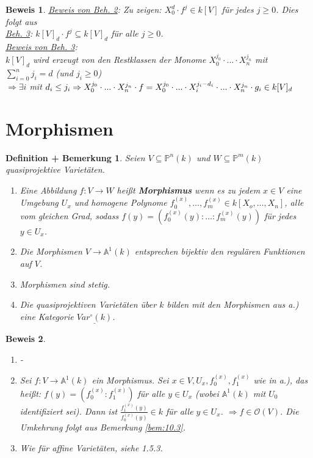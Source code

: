\documentclass[a4paper,12pt]{report}
\theoremstyle{break}
\newtheorem{DefBem}[Def]{Definition + Bemerkung}
\theoremstyle{nonumberbreak}
\theoremstyle{nonumberplain}
\newtheorem{Bew}{Beweis}
\newcommand{\emp}[1]{\textbf{\emph{#1}}}
\newcommand{\begriff}[1]{{\index{#1}}\emp{#1}}
\begin{document}
\begin{Bew}
\underline{Beweis von Beh. 2}: Zu zeigen: $X_0^d\cdot f^j\in k[V]$ für jedes $j\geq 0$. Dies folgt aus \\
\underline{Beh. 3}: $k[V]_d\cdot f^j\subseteq k[V]_d$ für alle $j\geq 0$.\\
\underline{Beweis von Beh. 3}:\\
$k[V]_d$ wird erzeugt von den Restklassen der Monome $X_0^{j_0}\cdot ... \cdot X_n^{j_n}$ mit $\sum_{i=0}^nj_i=d$ (und $j_i\geq 0$)\\
$\Rightarrow\exists i$ mit $d_i\leq j_i\\
\Rightarrow X_0^{j_0}\cdot ... \cdot X_n^{j_n}\cdot f=X_0^{j_0}\cdot ... \cdot X_i^{j_i-d_i}\cdot ... \cdot X_n^{j_n}\cdot g_i\in k[V]_d$
\end{Bew}


\section{Morphismen}
\begin{DefBem}
  \label{defbem:11.1}
  Seien $V\subseteq \mathbb P^n(k)$ und $W\subseteq \mathbb P^m(k)$ quasiprojektive Varietäten.
  \begin{enumerate}
  \item Eine Abbildung $f:V\longrightarrow W$ heißt \begriff{Morphismus} wenn es zu jedem $x\in V$ eine Umgebung $U_x$ und homogene 
    Polynome $f_0^{(x)},\dots,f_m^{(x)}\in k[X_o,\dots,X_n]$, alle vom gleichen Grad, sodass $f(y)=\left(f_0^{(x)}(y):\dots:f_m^{(x)}(y)\right)$
    für jedes $y\in U_x$.
  \item Die Morphismen $V\longrightarrow \mathbb A^1(k)$ entsprechen bijektiv den regulären Funktionen auf $V$.
  \item Morphismen sind stetig.
  \item Die quasiprojektiven Varietäten über $k$ bilden mit den Morphismen aus a.) eine Kategorie $\underline{Var^\circ(k)}$.
  \end{enumerate}
\end{DefBem}
\begin{Bew}
  \begin{enumerate}
  \item -
  \item Sei $f:V\longrightarrow\mathbb A^1(k)$ ein Morphismus. Sei $x\in V, U_x, f_0^{(x)},f_1^{(x)}$ wie in a.), das heißt: 
    $f(y)=\left(f_0^{(x)}:f_1^{(x)}\right)$ für alle $y\in U_x$ (wobei $\mathbb A^1(k)$ mit $U_0$ identifiziert sei).
    Dann ist $\frac{f_1^{(x)}(y)}{f_0^{(x)}(y)}\in k$ für alle $y\in U_x$. $\Rightarrow f\in \mathcal O(V)$. 
    Die Umkehrung folgt aus Bemerkung \ref{bem:10.3}.
  \item Wie für affine Varietäten, siehe 1.5.3.
  \end{enumerate}
\end{Bew}
\end{document}
